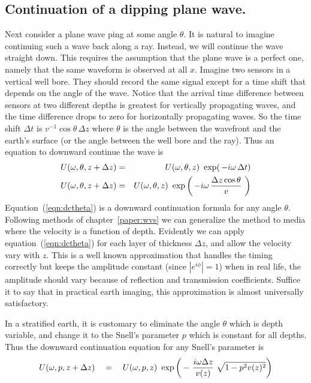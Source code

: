 \subsection{Continuation of a dipping plane wave.}
Next consider a plane wave ping at some angle $\theta$.
It is natural to imagine continuing such a wave back along a ray.
Instead, we will continue the wave straight down.
This requires the assumption that the plane wave is a perfect one,
namely that the same waveform is observed at all $x$.
Imagine two sensors in a vertical well bore.
They should record the same signal except for
a time shift that depends on the angle of the wave.
Notice that the arrival time difference between sensors
at two different depths is greatest for vertically propagating waves,
and the time difference drops to zero for horizontally propagating waves.
So the time shift $\Delta t$ is $v^{-1} \cos\theta\,\Delta z$
where $\theta$ is the angle between the wavefront and the earth's surface
(or the angle between the well bore and the ray).
Thus an equation to downward continue the wave is
\begin{eqnarray}
U( \omega , \theta ,z+\Delta z)
 &=&
U( \omega , \theta ,z) \ 
 \exp ( \,  -i \omega \, \Delta t)
                                                        \\
U( \omega , \theta ,z+\Delta z)
 &=&
U( \omega , \theta ,z) \ 
 \exp \left(
         \,  -i \omega \,
         {\Delta z \cos\theta \over v}\  
\right)
\label{eqn:dctheta}
\end{eqnarray}
Equation~(\ref{eqn:dctheta})
is a downward continuation formula for any angle $\theta$.
Following methods of chapter~\ref{paper:wvs} we can generalize
the method to media where the velocity is a function of depth.
Evidently we can apply equation~(\ref{eqn:dctheta})
for each layer of thickness $\Delta z$,
and allow the velocity vary with $z$.
This is a well known approximation that handles the timing correctly
but keeps the amplitude constant (since $|e^{i\phi}|=1$)
when in real life,
the amplitude should vary
because of reflection and transmission coefficients.
Suffice it to say that in practical earth imaging,
this approximation is almost universally satisfactory.
\par
In a stratified earth,
it is customary to eliminate the angle $\theta$ which is depth variable,
and change it to the Snell's parameter $p$ which is constant for all depths.
Thus the downward continuation equation for any Snell's parameter is
\begin{equation}
U( \omega , p,z+\Delta z)
 \eq
U( \omega , p,z) \ 
 \exp \left( \,  -\  {i \omega \Delta z \over v(z) } \
\sqrt{1-p^2v(z)^2}  \right)
\label{eqn:dcp}
\end{equation}
